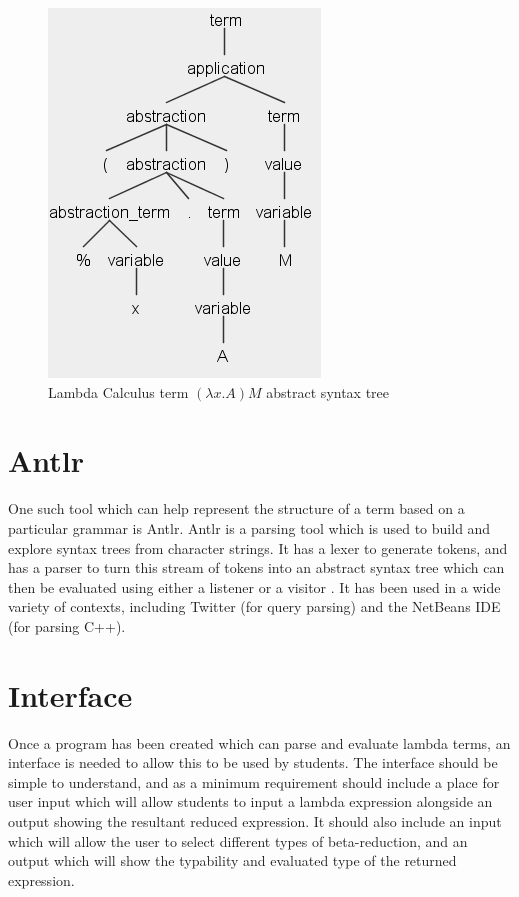 \documentclass[a4paper,12pt]{report}
\begin{document}
\begin{figure}[p]
	\centering
	\includegraphics[scale=0.75]{images/abstract_syntax_tree}
	\caption{Lambda Calculus term $(\lambda x.A)M$ abstract syntax tree}
	\label{abstract_syntax_tree}
\end{figure}


\section{Antlr}

One such tool which can help represent the structure of a term based on a particular grammar is Antlr. Antlr is a parsing tool which is used to build and explore syntax trees from character strings. It has a lexer to generate tokens, and has a parser to turn this stream of tokens into an abstract syntax tree which can then be evaluated using either a listener or a visitor \cite{Parr2012}. It has been used in a wide variety of contexts, including Twitter (for query parsing) and the NetBeans IDE (for parsing C++). %

\section{Interface}

Once a program has been created which can parse and evaluate lambda terms, an interface is needed to allow this to be used by students. The interface should be simple to understand, and as a minimum requirement should include a place for user input which will allow students to input a lambda expression alongside an output showing the resultant reduced expression. It should also include an input which will allow the user to select different types of beta-reduction, and an output which will show the typability and evaluated type of the returned expression.\\
\end{document}
